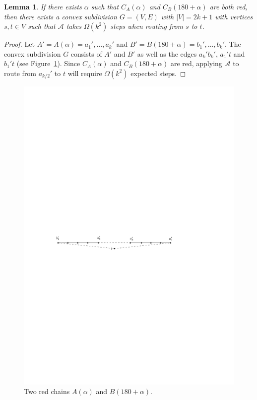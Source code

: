 \documentclass [letterpaper] {patmorin}
\newtheorem{lemma}{Lemma}%
\begin{document}
\begin{lemma}\label{lem:2red}
If there exists $\alpha$ such that $C_A(\alpha)$ and $C_B(180+\alpha)$ are both red, then there exists a convex subdivision $G=(V,E)$ with $|V|=2k+1$ with vertices $s,t\in V$ such that $\mathcal{A}$ takes $\Omega(k^2)$ steps when routing from $s$ to $t$.  
\end{lemma} 

\begin{proof}
Let $A'=A(\alpha)=a_1',\ldots,a_k'$ and $B'=B(180+\alpha)=b_1',\ldots,b_k'$.  The convex subdivision $G$ consists of $A'$ and $B'$ as well as the edges $a_k'b_k'$, $a_1't$ and $b_1't$ (see Figure~\ref{fig:2red}).  Since $C_A(\alpha)$ and $C_B(180+\alpha)$ are red, applying $\mathcal{A}$ to route from $a_{k/2}'$ to $t$ will require $\Omega(k^2)$ expected steps.
\end{proof}

\begin{figure}
  \centering
  \includegraphics{pics/2red.pdf}
  \caption{Two red chains $A(\alpha)$ and $B(180+\alpha)$.}
  \label{fig:2red}
\end{figure}
\end{document}
